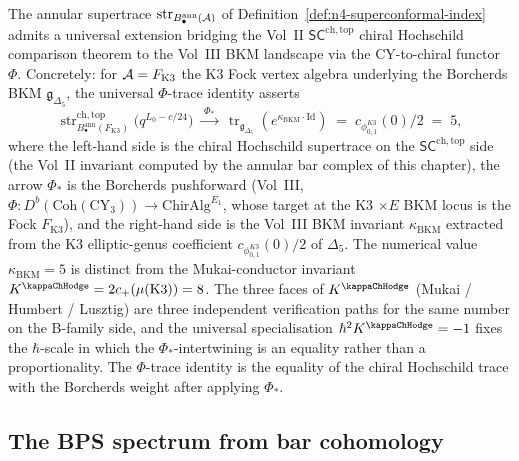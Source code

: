 \begin{remark}
\label{rem:oackd-front-universal-phi-trace}
%
%
%
%
%
The annular supertrace $\operatorname{str}_{B^{\mathrm{ann}}_\bullet(\mathcal{A})}$
of Definition~\ref{def:n4-superconformal-index} admits a
universal extension bridging the Vol~II
$\mathsf{SC}^{\mathrm{ch,top}}$ chiral Hochschild comparison theorem
to the Vol~III BKM landscape via the CY-to-chiral
functor $\Phi$. Concretely: for $\mathcal{A} = F_{\mathrm{K3}}$ the
K3 Fock vertex algebra underlying the Borcherds BKM
$\mathfrak{g}_{\Delta_5}$, the universal $\Phi$-trace
identity asserts
\[
 \operatorname{str}_{B^{\mathrm{ann}}_\bullet(F_{\mathrm{K3}})}^{\mathrm{ch,top}}
 \bigl(q^{L_0-c/24}\bigr)
 \;\xrightarrow{\;\Phi_{*}\;}\;
 \operatorname{tr}_{\mathfrak{g}_{\Delta_5}}(e^{\kappa_{\mathrm{BKM}}\cdot\mathrm{Id}})
 \;=\;
 c_{\phi_{0,1}^{K3}}(0)/2
 \;=\;
 5,
\]
where the left-hand side is the chiral Hochschild supertrace on the
$\mathsf{SC}^{\mathrm{ch,top}}$ side (the Vol~II invariant computed
by the annular bar complex of this chapter), the arrow
$\Phi_{*}$ is the Borcherds pushforward (Vol~III,
$\Phi\colon D^b(\mathrm{Coh}(\mathrm{CY}_3)) \to
\mathrm{ChirAlg}^{E_1}$, whose target at the K3 $\times E$
BKM locus is the Fock $F_{\mathrm{K3}}$), and the right-hand
side is the Vol~III BKM invariant $\kappa_{\mathrm{BKM}}$
extracted from the K3 elliptic-genus coefficient
$c_{\phi_{0,1}^{K3}}(0)/2$ of $\Delta_5$. The numerical value
$\kappa_{\mathrm{BKM}} = 5$ is distinct from the
Mukai-conductor invariant $K^{\kappaChHodge} =
2 c_+(\mu(\mathrm{K3})) = 8$. The three faces of
$K^{\kappaChHodge}$ (Mukai / Humbert / Lusztig) are three independent verification
paths for the same number on the B-family
side, and the universal specialisation
$\hbar^2 K^{\kappaChHodge} = -1$ fixes the
$\hbar$-scale in which the $\Phi_*$-intertwining is an
equality rather than a proportionality. The $\Phi$-trace
identity is the equality of the chiral Hochschild trace with the
Borcherds weight after applying $\Phi_*$.
\end{remark}

\subsection{The BPS spectrum from bar cohomology}
\label{subsec:bps-spectrum}

